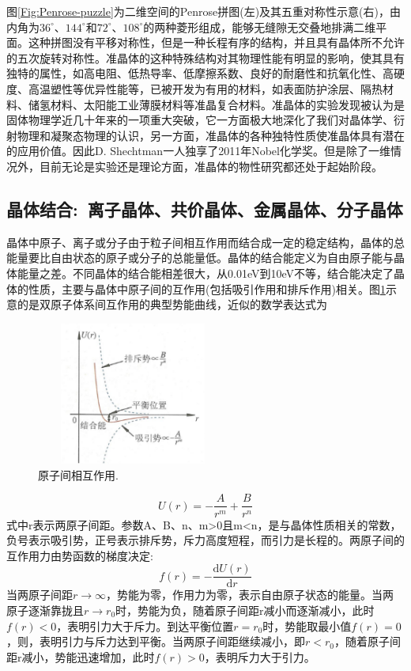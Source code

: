 图\ref{Fig:Penrose-puzzle}为二维空间的Penrose拼图(左)及其五重对称性示意(右)，由内角为$36^{\circ}$、$144^{\circ}$和$72^{\circ}$、$108^{\circ}$的两种菱形组成，能够无缝隙无交叠地排满二维平面。这种拼图没有平移对称性，但是一种长程有序的结构，并且具有晶体所不允许的五次旋转对称性。准晶体的这种特殊结构对其物理性能有明显的影响，使其具有独特的属性，如高电阻、低热导率、低摩擦系数、良好的耐磨性和抗氧化性、高硬度、高温塑性等优异性能等，已被开发为有用的材料，如表面防护涂层、隔热材料、储氢材料、太阳能工业薄膜材料等准晶复合材料。准晶体的实验发现被认为是固体物理学近几十年来的一项重大突破，它一方面极大地深化了我们对晶体学、衍射物理和凝聚态物理的认识，另一方面，准晶体的各种独特性质使准晶体具有潜在的应用价值。因此D. Shechtman一人独享了2011年Nobel化学奖。但是除了一维情况外，目前无论是实验还是理论方面，准晶体的物性研究都还处于起始阶段。

\subsection{晶体结合:~离子晶体、共价晶体、金属晶体、分子晶体}
晶体中原子、离子或分子由于粒子间相互作用而结合成一定的稳定结构，晶体的总能量要比自由状态的原子或分子的总能量低。晶体的结合能定义为自由原子能与晶体能量之差。不同晶体的结合能相差很大，从0.01eV到10eV不等，结合能决定了晶体的性质，主要与晶体中原子间的互作用(包括吸引作用和排斥作用)相关。图\ref{Fig:SSI-04}示意的是双原子体系间互作用的典型势能曲线，近似的数学表达式为
\begin{figure}[h!]
\centering
\vspace*{-0.1in}
\includegraphics[height=1.85in,width=2.5in,viewport=0 0 50 40,clip]{Figures/Interaction-2_Atoms.png}
\caption{\small \textrm{原子间相互作用.}}%
\label{Fig:SSI-04}
\end{figure}
\begin{equation}
	U(r)=-\dfrac{A}{r^m}+\dfrac{B}{r^n}
	\label{eq:SSI-01}
\end{equation}
式中r表示两原子间距。参数A、B、n、m>0且m<n，是与晶体性质相关的常数，负号表示吸引势，正号表示排斥势，斥力高度短程，而引力是长程的。两原子间的互作用力由势函数的梯度决定:
\begin{equation}
	f(r)=-\dfrac{\mathrm{d}U(r)}{\mathrm{d}r}
	\label{eq:SSI-02}
\end{equation}
当两原子间距$r\rightarrow\infty$，势能为零，作用力为零，表示自由原子状态的能量。当两原子逐渐靠拢且$r\rightarrow r_0$时，势能为负，随着原子间距r减小而逐渐减小，此时$f(r)<0$，表明引力大于斥力。到达平衡位置$r=r_0$时，势能取最小值$f(r)=0$，则，表明引力与斥力达到平衡。当两原子间距继续减小，即$r<r_0$，随着原子间距r减小，势能迅速增加，此时$f(r)>0$，表明斥力大于引力。

